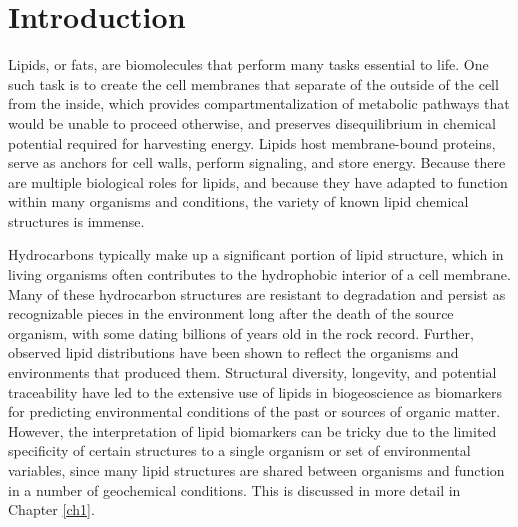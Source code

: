 \chapter{Introduction}


Lipids, or fats, are biomolecules that perform many tasks essential to life. One such task is to create the cell membranes that separate of the outside of the cell from the inside, which provides compartmentalization of metabolic pathways that would be unable to proceed otherwise, and preserves disequilibrium in chemical potential required for harvesting energy. Lipids host membrane-bound proteins, serve as anchors for cell walls, perform signaling, and store energy. Because there are multiple biological roles for lipids, and because they have adapted to function within many organisms and conditions, the variety of known lipid chemical structures is immense.

Hydrocarbons typically make up a significant portion of lipid structure, which in living organisms often contributes to the hydrophobic interior of a cell membrane. Many of these hydrocarbon structures are resistant to degradation and persist as recognizable pieces in the environment long after the death of the source organism, with some dating billions of years old in the rock record. Further, observed lipid distributions have been shown to reflect the organisms and environments that produced them. Structural diversity, longevity, and potential traceability have led to the extensive use of lipids in biogeoscience as biomarkers for predicting environmental conditions of the past or sources of organic matter. However, the interpretation of lipid biomarkers can be tricky due to the limited specificity of certain structures to a single organism or set of environmental variables, since many lipid structures are shared between organisms and function in a number of geochemical conditions. This is discussed in more detail in Chapter \ref{ch1}.

